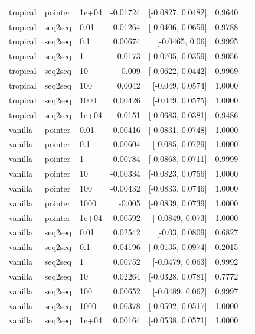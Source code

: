 \documentclass[10pt]{article}
\begin{document}
{\begin{longtable}{lllrrrl}
tropical & pointer & 1e+04 & -0.01724 & [-0.0827, 0.0482] & 0.9640 & \\
tropical & seq2seq & 0.01 & 0.01264 & [-0.0406, 0.0659] & 0.9788 & \\
tropical & seq2seq & 0.1 & 0.00674 & [-0.0465, 0.06] & 0.9995 & \\
tropical & seq2seq & 1 & -0.0173 & [-0.0705, 0.0359] & 0.9056 & \\
tropical & seq2seq & 10 & -0.009 & [-0.0622, 0.0442] & 0.9969 & \\
tropical & seq2seq & 100 & 0.0042 & [-0.049, 0.0574] & 1.0000 & \\
tropical & seq2seq & 1000 & 0.00426 & [-0.049, 0.0575] & 1.0000 & \\
tropical & seq2seq & 1e+04 & -0.0151 & [-0.0683, 0.0381] & 0.9486 & \\
vanilla & pointer & 0.01 & -0.00416 & [-0.0831, 0.0748] & 1.0000 & \\
vanilla & pointer & 0.1 & -0.00604 & [-0.085, 0.0729] & 1.0000 & \\
vanilla & pointer & 1 & -0.00784 & [-0.0868, 0.0711] & 0.9999 & \\
vanilla & pointer & 10 & -0.00334 & [-0.0823, 0.0756] & 1.0000 & \\
vanilla & pointer & 100 & -0.00432 & [-0.0833, 0.0746] & 1.0000 & \\
vanilla & pointer & 1000 & -0.005 & [-0.0839, 0.0739] & 1.0000 & \\
vanilla & pointer & 1e+04 & -0.00592 & [-0.0849, 0.073] & 1.0000 & \\
vanilla & seq2seq & 0.01 & 0.02542 & [-0.03, 0.0809] & 0.6827 & \\
vanilla & seq2seq & 0.1 & 0.04196 & [-0.0135, 0.0974] & 0.2015 & \\
vanilla & seq2seq & 1 & 0.00752 & [-0.0479, 0.063] & 0.9992 & \\
vanilla & seq2seq & 10 & 0.02264 & [-0.0328, 0.0781] & 0.7772 & \\
vanilla & seq2seq & 100 & 0.00652 & [-0.0489, 0.062] & 0.9997 & \\
vanilla & seq2seq & 1000 & -0.00378 & [-0.0592, 0.0517] & 1.0000 & \\
vanilla & seq2seq & 1e+04 & 0.00164 & [-0.0538, 0.0571] & 1.0000 & \\
\bottomrule
\end{longtable}
}
\end{document}
